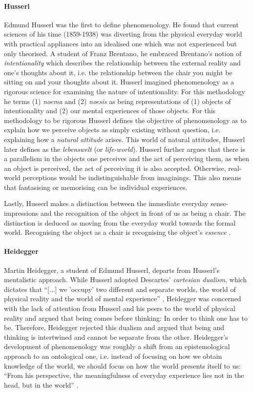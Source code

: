 \paragraph{Husserl} Edmund Husserl was the first to define phenomenology. He found that current sciences of his time (1859-1938) was diverting from the physical everyday world with practical appliances into an idealised one which was not experienced but only theorised. A student of Franz Brentano, he embraced Brentano's notion of \textit{intentionality} which describes the relationship between the external reality and one's thoughts about it, i.e. the relationship between the chair you might be sitting on and your thoughts about it. Husserl imagined phenomenology as a rigorous science for examining the nature of intentionality. For this methodology he terms (1) \textit{noema} and (2) \textit{noesis} as being representations of (1) objects of intentionality and (2) our mental experiences of those objects. For this methodology to be rigorous Husserl defines the objective of phenomenology as to explain how we perceive objects as simply existing without question, i.e. explaining how a \textit{natural attitude} arises. This world of natural attitudes, Husserl later defines as the \textit{lebenswelt} (or \textit{life-world}). Husserl further argues that there is a parallelism in the objects one perceives and the act of perceiving them, as when an object is perceived, the act of perceiving it is also accepted. Otherwise, real-world perceptions would be indistinguishable from imaginings. This also means that fantasising or memorising can be individual experiences.

Lastly, Husserl makes a distinction between the immediate everyday sense-impressions and the recognition of the object in front of us as being a chair. The distinction is deduced as moving from the everyday world towards the formal world. Recognising the object as a chair is recognising the object's \textit{essence} \cite{dourish}.

\paragraph{Heidegger} Martin Heidegger, a student of Edmund Husserl, departs from Husserl's mentalistic approach. While Husserl adopted Descartes' \textit{cartesian dualism}, which dictates that ``[...] we 'occupy' two different and separate worlds, the world of physical reality and the world of mental experience'' \cite[p. 107]{dourish}, Heidegger was concerned with the lack of attention from Husserl and his peers to the world of physical reality and argued that being comes before thinking: In order to think one has to be. Therefore, Heidegger rejected this dualism and argued that being and thinking is intertwined and cannot be separate from the other. Heidegger's development of phenomenology was roughly a shift from an epistemological approach to an ontological one, i.e. instead of focusing on how we obtain knowledge of the world, we should focus on how the world presents itself to us: ``From his perspective, the meaningfulness of everyday experience lies not in the head, but in the world'' \cite[p. 107]{dourish}.

